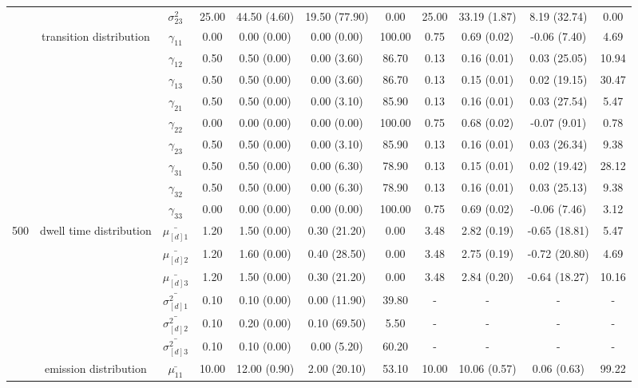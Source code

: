 \begin{table}[h]
{\begin{tabular}{ccccccccccc}
 &  & $\sigma^2_{23}$ & 25.00 & 44.50 (4.60) & 19.50 (77.90) & 0.00 & 25.00 & 33.19 (1.87) & 8.19 (32.74) & 0.00 \\
 & transition distribution & $\gamma_{11}$ & 0.00 & 0.00 (0.00) & 0.00 (0.00) & 100.00 & 0.75 & 0.69 (0.02) & -0.06 (7.40) & 4.69 \\
 & \multirow{8}{*}{} & $\gamma_{12}$ & 0.50 & 0.50 (0.00) & 0.00 (3.60) & 86.70 & 0.13 & 0.16 (0.01) & 0.03 (25.05) & 10.94 \\
 &  & $\gamma_{13}$ & 0.50 & 0.50 (0.00) & 0.00 (3.60) & 86.70 & 0.13 & 0.15 (0.01) & 0.02 (19.15) & 30.47 \\
 &  & $\gamma_{21}$ & 0.50 & 0.50 (0.00) & 0.00 (3.10) & 85.90 & 0.13 & 0.16 (0.01) & 0.03 (27.54) & 5.47 \\
 &  & $\gamma_{22}$ & 0.00 & 0.00 (0.00) & 0.00 (0.00) & 100.00 & 0.75 & 0.68 (0.02) & -0.07 (9.01) & 0.78 \\
 &  & $\gamma_{23}$ & 0.50 & 0.50 (0.00) & 0.00 (3.10) & 85.90 & 0.13 & 0.16 (0.01) & 0.03 (26.34) & 9.38 \\
 &  & $\gamma_{31}$ & 0.50 & 0.50 (0.00) & 0.00 (6.30) & 78.90 & 0.13 & 0.15 (0.01) & 0.02 (19.42) & 28.12 \\
 &  & $\gamma_{32}$ & 0.50 & 0.50 (0.00) & 0.00 (6.30) & 78.90 & 0.13 & 0.16 (0.01) & 0.03 (25.13) & 9.38 \\
 &  & $\gamma_{33}$ & 0.00 & 0.00 (0.00) & 0.00 (0.00) & 100.00 & 0.75 & 0.69 (0.02) & -0.06 (7.46) & 3.12 \\ \midrule
500 & dwell time distribution & $\bar{\mu_{[d]1}}$ & 1.20 & 1.50 (0.00) & 0.30 (21.20) & 0.00 & 3.48 & 2.82 (0.19) & -0.65 (18.81) & 5.47 \\
\multirow{26}{*}{} & \multirow{5}{*}{} & $\bar{\mu_{[d]2}}$ & 1.20 & 1.60 (0.00) & 0.40 (28.50) & 0.00 & 3.48 & 2.75 (0.19) & -0.72 (20.80) & 4.69 \\
 &  & $\bar{\mu_{[d]3}}$ & 1.20 & 1.50 (0.00) & 0.30 (21.20) & 0.00 & 3.48 & 2.84 (0.20) & -0.64 (18.27) & 10.16 \\
 &  & $\bar{\sigma^2_{[d]1}}$ & 0.10 & 0.10 (0.00) & 0.00 (11.90) & 39.80 & - & - & - & - \\
 &  & $\bar{\sigma^2_{[d]2}}$ & 0.10 & 0.20 (0.00) & 0.10 (69.50) & 5.50 & - & - & - & - \\
 &  & $\bar{\sigma^2_{[d]3}}$ & 0.10 & 0.10 (0.00) & 0.00 (5.20) & 60.20 & - & - & - & - \\
 & emission distribution & $\bar{\mu_{11}}$ & 10.00 & 12.00 (0.90) & 2.00 (20.10) & 53.10 & 10.00 & 10.06 (0.57) & 0.06 (0.63) & 99.22 \\

\end{tabular}}
\end{table}
